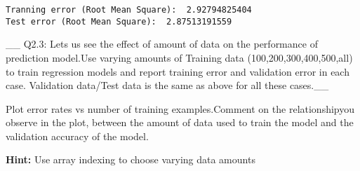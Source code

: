 \documentclass[11pt]{article}
\begin{document}
    \begin{Verbatim}[commandchars=\\\{\}]
Tranning error (Root Mean Square):  2.92794825404
Test error (Root Mean Square):  2.87513191559

    \end{Verbatim}

    \_\_ Q2.3: Lets us see the effect of amount of data on the performance
of prediction model.Use varying amounts of Training data
(100,200,300,400,500,all) to train regression models and report training
error and validation error in each case. Validation data/Test data is
the same as above for all these cases.\_\_

Plot error rates vs number of training examples.Comment on the
relationshipyou observe in the plot, between the amount of data used to
train the model and the validation accuracy of the model.

\textbf{Hint:} Use array indexing to choose varying data amounts
\end{document}

